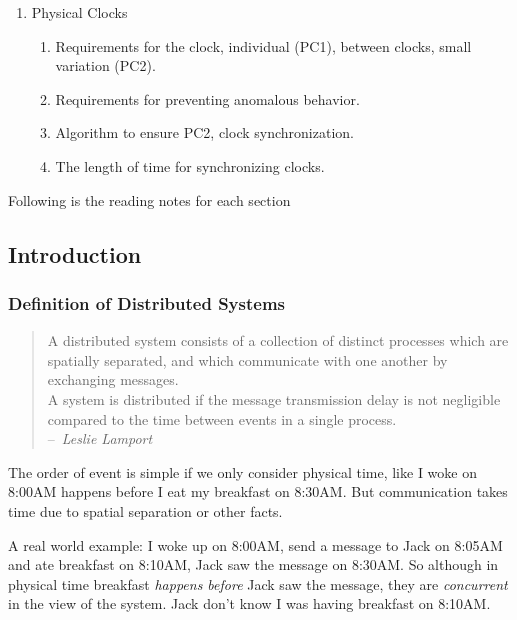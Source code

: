 \documentclass[12pt,a4paper,oneside]{article}
\begin{document}
\begin{enumerate}
\begin{enumerate}
  \end{enumerate}
  \item Physical Clocks
  \begin{enumerate}
      \item Requirements for the clock, individual (PC1), between clocks, small variation (PC2).
      \item Requirements for preventing anomalous behavior.
      \item Algorithm to ensure PC2, clock synchronization.
      \item The length of time for synchronizing clocks.
  \end{enumerate}
\end{enumerate}

Following is the reading notes for each section

\subsection{Introduction} \label{s:intro}

\subsubsection{Definition of Distributed Systems} \label{s:intro:s:dist}

\begin{quote}
  A distributed system consists of a collection of distinct processes which are
spatially separated, and which communicate with one another by exchanging messages. \\
  A system is distributed if the message transmission delay is not negligible compared
to the time between events in a single process.\cite{l} \\

--\ \textit{Leslie Lamport}
\end{quote}

The order of event is simple if we only consider physical time, like I woke on 8:00AM happens before
I eat my breakfast on 8:30AM.
But communication takes time due to spatial separation or other facts.

A real world example:
I woke up on 8:00AM, send a message to Jack on 8:05AM and ate breakfast on 8:10AM,
Jack saw the message on 8:30AM.
So although in physical time breakfast \textit{happens before} Jack saw the message, they are \textit{concurrent}
in the view of the system. Jack don't know I was having breakfast on 8:10AM. %
\end{document}
